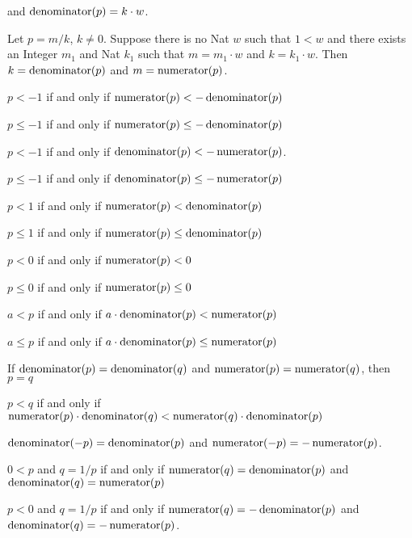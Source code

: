 \documentclass{article}
\begin{document}
\begin{thm}
  and $\operatorname{denominator}(p)=k\cdot w$.
\item\label{rat1:30} Let $p=m/k$, $k\neq0$. Suppose there is no Nat $w$ such that $1<w$ and there
  exists an Integer $m_{1}$ and Nat $k_{1}$ such that $m=m_{1}\cdot w$
  and $k=k_{1}\cdot w$.
  Then $k=\operatorname{denominator}(p)$ and $m=\operatorname{numerator}(p)$.
\item\label{rat1:31} $p<-1$ if and only if $\operatorname{numerator}(p)<-\operatorname{denominator}(p)$ 
\item\label{rat1:32} $p\leq-1$ if and only if $\operatorname{numerator}(p)\leq-\operatorname{denominator}(p)$
\item\label{rat1:33} $p<-1$ if and only if $\operatorname{denominator}(p)<-\operatorname{numerator}(p)$.
\item\label{rat1:34} $p\leq-1$ if and only if $\operatorname{denominator}(p)\leq-\operatorname{numerator}(p)$
\item\label{rat1:35} $p<1$ if and only if $\operatorname{numerator}(p)<\operatorname{denominator}(p)$
\item\label{rat1:36} $p\leq1$ if and only if $\operatorname{numerator}(p)\leq\operatorname{denominator}(p)$
\item\label{rat1:37} $p<0$ if and only if $\operatorname{numerator}(p)<0$
\item\label{rat1:38} $p\leq0$ if and only if $\operatorname{numerator}(p)\leq0$
\item\label{rat1:39} $a<p$ if and only if $a\cdot\operatorname{denominator}(p)<\operatorname{numerator}(p)$
\item\label{rat1:40} $a\leq p$ if and only if
  $a\cdot\operatorname{denominator}(p)\leq\operatorname{numerator}(p)$
\item\label{rat1:41} If $\operatorname{denominator}(p)=\operatorname{denominator}(q)$ and $\operatorname{numerator}(p)=\operatorname{numerator}(q)$,
  then $p=q$
\item\label{rat1:42} $p<q$ if and only if $\operatorname{numerator}(p)\cdot\operatorname{denominator}(q)<\operatorname{numerator}(q)\cdot\operatorname{denominator}(p)$
\item\label{rat1:43} $\operatorname{denominator}(-p)=\operatorname{denominator}(p)$ and $\operatorname{numerator}(-p)=-\operatorname{numerator}(p)$.
\item\label{rat1:44} $0<p$ and $q=1/p$ if and only if
  $\operatorname{numerator}(q)=\operatorname{denominator}(p)$ and $\operatorname{denominator}(q)=\operatorname{numerator}(p)$
\item\label{rat1:45} $p<0$ and $q=1/p$ if and only if
  $\operatorname{numerator}(q)=-\operatorname{denominator}(p)$ and $\operatorname{denominator}(q)=-\operatorname{numerator}(p)$.
\end{thm}
\end{document}
